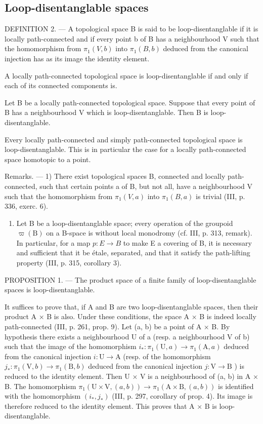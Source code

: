 \subsection{Loop-disentanglable spaces}

DEFINITION 2. --- A topological space B is said to be loop-disentanglable if it is locally path-connected and if every point b of B has a neighbourhood V such that the homomorphism from \(\pi_1(V,b)\) into \(\pi_1(B,b)\) deduced from the canonical injection has as its image the identity element.

A locally path-connected topological space is loop-disentanglable if and only if each of its connected components is.

Let B be a locally path-connected topological space. Suppose that every point of B has a neighbourhood V which is loop-disentanglable. Then B is loop-disentanglable.

Every locally path-connected and simply path-connected topological space is loop-disentanglable. This is in particular the case for a locally path-connected space homotopic to a point.

Remarks. --- 1) There exist topological spaces B, connected and locally path-connected, such that certain points a of B, but not all, have a neighbourhood V such that the homomorphism from \(\pi_{1}(V,a)\) into \(\pi_{1}(B,a)\) is trivial (III, p. 336, exerc. 6).

\begin{enumerate}
\def\labelenumi{\arabic{enumi})}
\setcounter{enumi}{1}
\tightlist
\item
  Let B be a loop-disentanglable space; every operation of the groupoid \(\varpi(\mathrm{B})\) on a B-space is without local monodromy (cf. III, p. 313, remark). In particular, for a map \(p: E \rightarrow B\) to make E a covering of B, it is necessary and sufficient that it be étale, separated, and that it satisfy the path-lifting property (III, p. 315, corollary 3).
\end{enumerate}

PROPOSITION 1. --- The product space of a finite family of loop-disentanglable spaces is loop-disentanglable.

It suffices to prove that, if A and B are two loop-disentanglable spaces, then their product A × B is also. Under these conditions, the space A × B is indeed locally path-connected (III, p. 261, prop. 9). Let (a, b) be a point of A × B. By hypothesis there exists a neighbourhood U of a (resp. a neighbourhood V of b) such that the image of the homomorphism \(i_* \colon \pi_1(\mathrm{U}, a) \to \pi_1(\mathrm{A}, a)\) deduced from the canonical injection \(i \colon \mathrm{U} \to \mathrm{A}\) (resp. of the homomorphism \(j_* \colon \pi_1(\mathrm{V}, b) \to \pi_1(\mathrm{B}, b)\) deduced from the canonical injection \(j \colon \mathrm{V} \to \mathrm{B}\) ) is reduced to the identity element. Then U × V is a neighbourhood of (a, b) in A × B. The homomorphism \(\pi_1(\mathrm{U} \times \mathrm{V}, (a, b)) \to \pi_1(\mathrm{A} \times \mathrm{B}, (a, b))\) is identified with the homomorphism \((i_*, j_*)\) (III, p. 297, corollary of prop. 4). Its image is therefore reduced to the identity element. This proves that A × B is loop-disentanglable.

